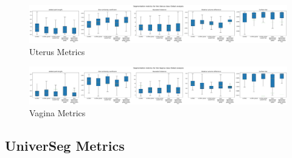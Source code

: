 \documentclass[11pt,twoside]{report}
\begin{document}
\begin{landscape}
  \begin{figure}[H]
    \centering
    \includegraphics[width=\linewidth]{../../research/source/code/data/metrics/metricsuterus_1_combinednotable_Global_analysis.png}
    \caption{Uterus Metrics}\label{fig:region-based-metrics-uterus}
  \end{figure}

  \begin{figure}[H]
    \centering
    \includegraphics[width=\linewidth]{../../research/source/code/data/metrics/metricsvagina_1_combinednotable_Global_analysis.png}
    \caption{Vagina Metrics}\label{fig:region-based-metrics-vagina}
  \end{figure}

\end{landscape}

\subsection{UniverSeg Metrics}\label{sect:universeg-appendix}

\end{document}
